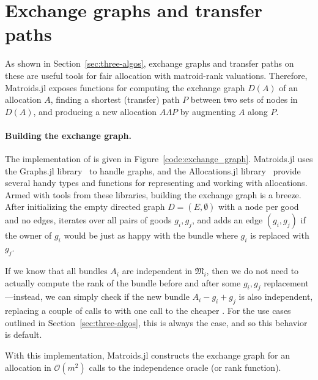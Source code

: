 \section{Exchange graphs and transfer paths}
As shown in Section~\ref{sec:three-algos}, exchange graphs and transfer paths on these are useful tools for fair allocation with matroid-rank valuations. Therefore, Matroids.jl exposes functions for computing the exchange graph $D(A)$ of an allocation $A$, finding a shortest (transfer) path $P$ between two sets of nodes in $D(A)$, and producing a new allocation $A \Lambda P$ by augmenting $A$ along $P$.

\paragraph{Building the exchange graph.} The implementation of  is given in Figure~\ref{code:exchange_graph}. Matroids.jl uses the Graphs.jl library~\cite{Graphs2021} to handle graphs, and the Allocations.jl library~\cite{Hetland_Allocations_jl_2022} provide several handy types and functions for representing and working with allocations. Armed with tools from these libraries, building the exchange graph is a breeze. After initializing the empty directed graph $D = (E, \emptyset)$ with a node per good and no edges,  iterates over all pairs of goods $g_i, g_j$, and adds an edge $(g_i, g_j)$ if the owner of $g_i$ would be just as happy with the bundle where $g_i$ is replaced with $g_j$.

If we know that all bundles $A_i$ are independent in $\mathfrak{M}_i$, then we do not need to actually compute the rank of the bundle before and after some $g_i, g_j$ replacement---instead, we can simply check if the new bundle $A_i - g_i + g_j$ is also independent, replacing a couple of calls to  with one call to the cheaper . For the use cases outlined in Section~\ref{sec:three-algos}, this is always the case, and so this behavior is default.

With this implementation, Matroids.jl constructs the exchange graph for an allocation in $\mathcal{O}(m^2)$ calls to the independence oracle (or rank function).

